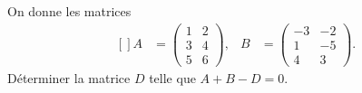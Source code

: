 \begin{exercice}\label{exoLineraire0005}

On donne les matrices
\begin{equation}
	\begin{aligned}[]
		A&=\begin{pmatrix}
  1	&	2	\\ 
  3	&	4	\\ 
 5	&	6	
\end{pmatrix},
	&B&=\begin{pmatrix}
  -3	&	-2	\\ 
  1	&	-5	\\ 
 4	&	3	
\end{pmatrix}.
	\end{aligned}
\end{equation}
Déterminer la matrice $D$ telle que $A+B-D=0$.

\end{exercice}
